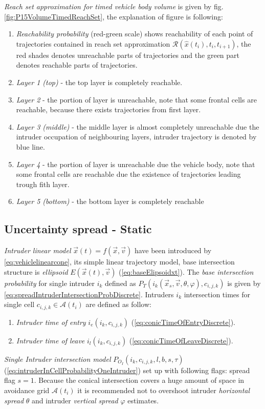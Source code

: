 \noindent\emph{Reach set approximation for timed vehicle body volume}  is given by fig. \ref{fig:P15VolumeTimedReachSet}, the explanation of figure is following:
\begin{enumerate}
    \item\emph{Reachability probability} (red-green scale) shows reachability of each point of trajectories contained in reach set approximation $\mathscr{R}(\hat{x}(t_i),t_i,t_{i+1})$, the red shades denotes unreachable parts of trajectories and the green part denotes reachable parts of trajectories.
    \item\emph{Layer 1 (top)} - the top layer is completely reachable.
    \item\emph{Layer 2} - the portion of layer is unreachable, note that some frontal cells are reachable, because there exists trajectories from first layer.
    \item\emph{Layer 3 (middle)} - the middle layer is almost completely unreachable due the intruder occupation of neighbouring layers, intruder trajectory is denoted by blue line.
    \item\emph{Layer 4} - the portion of layer is unreachable due the vehicle body, note that some frontal cells are reachable due the existence of trajectories leading trough fith layer. 
    \item\emph{Layer 5 (bottom)} - the bottom layer is completely reachable
\end{enumerate}

\subsection{Uncertainty spread - Static}
\noindent\emph{Intruder linear model} $\vec{x}(t)=f(\vec{x},\vec{v})$ have been introduced by \ref{eq:vehiclelinearcone}, its simple linear trajectory model, base intersection structure is  \emph{ellipsoid} $E(\vec{x}(t),\vec{v})$ (\ref{eq:baseElipsoidxt}). The \emph{base intersection probability} for single intruder $i_k$ defined as $P_T(i_k(\vec{x}_s,\vec{v},\theta,\varphi),c_{i,j,k})$ is given by \ref{eq:spreadIntruderIntersectionProbDiscrete}. Intruders $i_k$ intersection times for single cell $c_{i,j,k}\in\mathscr{A}(t_i)$ are defined as follow:
\begin{enumerate}
    \item\emph{Intruder time of entry} $i_e(i_k,c_{i,j,k})$ (\ref{eq:conicTimeOfEntryDiscrete}).
    \item\emph{Intruder time of leave} $i_l(i_k,c_{i,j,k})$ (\ref{eq:conicTimeOfLeaveDiscrete}).
\end{enumerate}
\emph{Single Intruder intersection model} $ P_{O_I}(i_k,c_{i,j,k},l,b,s,\tau)$ (\ref{eq:intruderInCellProbabilityOneIntruder}) set up with following flags:  spread flag $s=1$. Because the conical intersection covers a huge amount of space in avoidance grid $\mathscr{A}(t_i)$ it is recommended not to overshoot intruder \emph{horizontal spread} $\theta$ and intruder \emph{vertical spread} $\varphi$ estimates.

